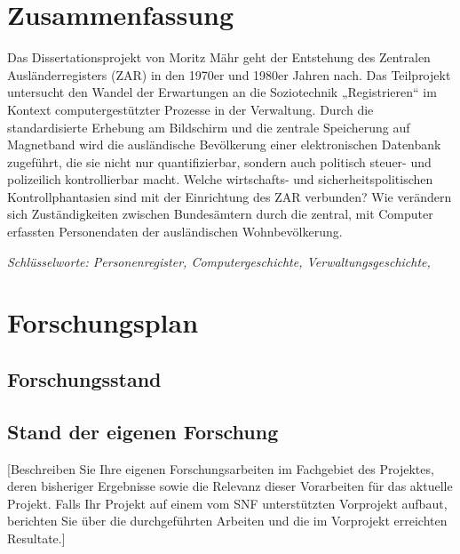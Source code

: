 \documentclass[11pt,ngerman,a4paper,]{scrartcl}
\title{}
\author{}
\date{}
\begin{document}
{
\hypersetup{linkcolor=black}
\setcounter{tocdepth}{3}
\tableofcontents
}
\listoftables
\listoffigures
\hypertarget{zusammenfassung}{%
\section{Zusammenfassung}\label{zusammenfassung}}

Das Dissertationsprojekt von Moritz Mähr geht der Entstehung des
Zentralen Ausländerregisters (ZAR) in den 1970er und 1980er Jahren nach.
Das Teilprojekt untersucht den Wandel der Erwartungen an die
Soziotechnik „Registrieren`` im Kontext computergestützter Prozesse in
der Verwaltung. Durch die standardisierte Erhebung am Bildschirm und die
zentrale Speicherung auf Magnetband wird die ausländische Bevölkerung
einer elektronischen Datenbank zugeführt, die sie nicht nur
quantifizierbar, sondern auch politisch steuer- und polizeilich
kontrollierbar macht. Welche wirtschafts- und sicherheitspolitischen
Kontrollphantasien sind mit der Einrichtung des ZAR verbunden? Wie
verändern sich Zuständigkeiten zwischen Bundesämtern durch die zentral,
mit Computer erfassten Personendaten der ausländischen Wohnbevölkerung.

\emph{Schlüsselworte: Personenregister, Computergeschichte,
Verwaltungsgeschichte,}

\hypertarget{forschungsplan}{%
\section{Forschungsplan}\label{forschungsplan}}

\hypertarget{forschungsstand}{%
\subsection{Forschungsstand}\label{forschungsstand}}

\hypertarget{stand-der-eigenen-forschung}{%
\subsection{Stand der eigenen
Forschung}\label{stand-der-eigenen-forschung}}

{[}Beschreiben Sie Ihre eigenen Forschungsarbeiten im Fachgebiet des
Projektes, deren bisheriger Ergebnisse sowie die Relevanz dieser
Vorarbeiten für das aktuelle Projekt. Falls Ihr Projekt auf einem vom
SNF unterstützten Vorprojekt aufbaut, berichten Sie über die
durchgeführten Arbeiten und die im Vorprojekt erreichten Resultate.{]}
\end{document}
